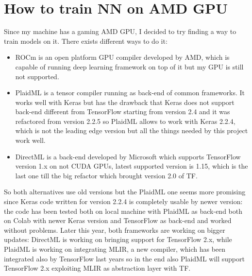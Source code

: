 \documentclass{article}
\begin{document}

\section{How to train NN on AMD GPU}
\label{sec:AMD}

Since my machine has a gaming AMD GPU, I decided to try finding a way to train models on it. There exists different ways to do it: 

\begin{itemize}
	\item ROCm \cite{rocm} is an open platform GPU compiler developed by AMD, which is capable of running deep learning framework on top of it but my GPU is still not supported.
	\item PlaidML \cite{Plaid} is a tensor compiler running as back-end of common frameworks. It works well with Keras but has the drawback that Keras does not support back-end different from TensorFlow starting from version 2.4 and it was refactored from version 2.2.5 so PlaidML allows to work with Keras 2.2.4, which is not the leading edge version but all the things needed by this project work well.
	\item DirectML \cite{directML} is a back-end developed by Microsoft which supports TensorFlow version 1.x on not CUDA GPUs, latest supported version is 1.15, which is the last one till the big refactor which brought version 2.0 of TF. 
\end{itemize}

So both alternatives use old versions but the PlaidML one seems more promising since Keras code written for version 2.2.4 is completely usable by newer version: the code has been tested both on local machine with PlaidML as back-end both on Colab with newer Keras version and TensorFlow as back-end and worked without problems.\newline
Later this year, both frameworks are working on bigger updates: DirectML is working on bringing support for TensorFlow 2.x, while PlaidML is working on integrating MLIR, a new compiler, which has been integrated also by TensorFlow last years so in the end also PlaidML will support TensorFlow 2.x exploiting MLIR as abstraction layer with TF.

\end{document}
